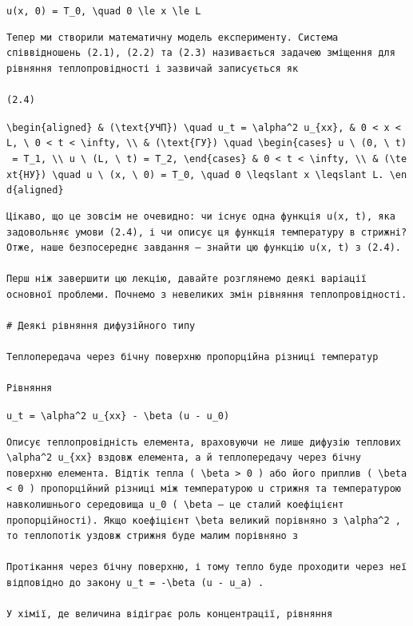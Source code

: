 \documentclass[
  ukrainian,
]{article}
\begin{document}
\texttt{u(x,\ 0)\ =\ T\_0,\ \textbackslash{}quad\ 0\ \textbackslash{}le\ x\ \textbackslash{}le\ L}

\begin{verbatim}
Тепер ми створили математичну модель експерименту. Система співвідношень (2.1), (2.2) та (2.3) називається задачею зміщення для рівняння теплопровідності і зазвичай записується як

(2.4)
\end{verbatim}

\texttt{\textbackslash{}begin\{aligned\}\ \&\ (\textbackslash{}text\{УЧП\})\ \textbackslash{}quad\ u\_t\ =\ \textbackslash{}alpha\^{}2\ u\_\{xx\},\ \&\ 0\ \textless{}\ x\ \textless{}\ L,\ \textbackslash{}\ 0\ \textless{}\ t\ \textless{}\ \textbackslash{}infty,\ \textbackslash{}\textbackslash{}\ \&\ (\textbackslash{}text\{ГУ\})\ \textbackslash{}quad\ \textbackslash{}begin\{cases\}\ u\ \textbackslash{}\ (0,\ \textbackslash{}\ t)\ =\ T\_1,\ \textbackslash{}\textbackslash{}\ u\ \textbackslash{}\ (L,\ \textbackslash{}\ t)\ =\ T\_2,\ \textbackslash{}end\{cases\}\ \&\ 0\ \textless{}\ t\ \textless{}\ \textbackslash{}infty,\ \textbackslash{}\textbackslash{}\ \&\ (\textbackslash{}text\{НУ\})\ \textbackslash{}quad\ u\ \textbackslash{}\ (x,\ \textbackslash{}\ 0)\ =\ T\_0,\ \textbackslash{}quad\ 0\ \textbackslash{}leqslant\ x\ \textbackslash{}leqslant\ L.\ \textbackslash{}end\{aligned\}}

\begin{verbatim}
Цікаво, що це зовсім не очевидно: чи існує одна функція u(x, t), яка задовольняє умови (2.4), і чи описує ця функція температуру в стрижні? Отже, наше безпосереднє завдання — знайти цю функцію u(x, t) з (2.4).

Перш ніж завершити цю лекцію, давайте розглянемо деякі варіації основної проблеми. Почнемо з невеликих змін рівняння теплопровідності.

# Деякі рівняння дифузійного типу

Теплопередача через бічну поверхню пропорційна різниці температур

Рівняння
\end{verbatim}

\texttt{u\_t\ =\ \textbackslash{}alpha\^{}2\ u\_\{xx\}\ -\ \textbackslash{}beta\ (u\ -\ u\_0)}

\begin{verbatim}
Описує теплопровідність елемента, враховуючи не лише дифузію теплових \alpha^2 u_{xx} вздовж елемента, а й теплопередачу через бічну поверхню елемента. Відтік тепла ( \beta > 0 ) або його приплив ( \beta < 0 ) пропорційний різниці між температурою u стрижня та температурою навколишнього середовища u_0 ( \beta — це сталий коефіцієнт пропорційності). Якщо коефіцієнт \beta великий порівняно з \alpha^2 , то теплопотік уздовж стрижня буде малим порівняно з

Протікання через бічну поверхню, і тому тепло буде проходити через неї відповідно до закону u_t = -\beta (u - u_a) .

У хімії, де величина відіграє роль концентрації, рівняння
\end{verbatim}
\end{document}
